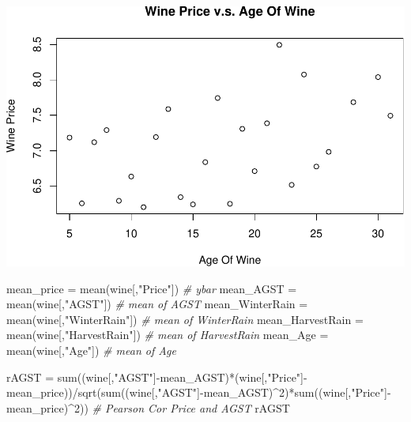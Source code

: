 \documentclass[
]{article}
\newenvironment{Shaded}{\begin{snugshade}}{\end{snugshade}}
\newcommand{\CommentTok}[1]{\textcolor[rgb]{0.56,0.35,0.01}{\textit{#1}}}
\newcommand{\DecValTok}[1]{\textcolor[rgb]{0.00,0.00,0.81}{#1}}
\newcommand{\FunctionTok}[1]{\textcolor[rgb]{0.00,0.00,0.00}{#1}}
\newcommand{\NormalTok}[1]{#1}
\newcommand{\OtherTok}[1]{\textcolor[rgb]{0.56,0.35,0.01}{#1}}
\newcommand{\SpecialCharTok}[1]{\textcolor[rgb]{0.00,0.00,0.00}{#1}}
\newcommand{\StringTok}[1]{\textcolor[rgb]{0.31,0.60,0.02}{#1}}
\begin{document}
\includegraphics{HW2_Wu-Yulun_files/figure-latex/unnamed-chunk-9-4.pdf}

\begin{Shaded}
\begin{Highlighting}[]
\NormalTok{mean\_price }\OtherTok{=} \FunctionTok{mean}\NormalTok{(wine[,}\StringTok{"Price"}\NormalTok{]) }\CommentTok{\# ybar}
\NormalTok{mean\_AGST }\OtherTok{=} \FunctionTok{mean}\NormalTok{(wine[,}\StringTok{"AGST"}\NormalTok{]) }\CommentTok{\# mean of AGST}
\NormalTok{mean\_WinterRain }\OtherTok{=} \FunctionTok{mean}\NormalTok{(wine[,}\StringTok{"WinterRain"}\NormalTok{]) }\CommentTok{\# mean of WinterRain}
\NormalTok{mean\_HarvestRain }\OtherTok{=} \FunctionTok{mean}\NormalTok{(wine[,}\StringTok{"HarvestRain"}\NormalTok{]) }\CommentTok{\# mean of HarvestRain}
\NormalTok{mean\_Age }\OtherTok{=} \FunctionTok{mean}\NormalTok{(wine[,}\StringTok{"Age"}\NormalTok{]) }\CommentTok{\# mean of Age}

\NormalTok{rAGST }\OtherTok{=} \FunctionTok{sum}\NormalTok{((wine[,}\StringTok{"AGST"}\NormalTok{]}\SpecialCharTok{{-}}\NormalTok{mean\_AGST)}\SpecialCharTok{*}\NormalTok{(wine[,}\StringTok{"Price"}\NormalTok{]}\SpecialCharTok{{-}}\NormalTok{mean\_price))}\SpecialCharTok{/}\FunctionTok{sqrt}\NormalTok{(}\FunctionTok{sum}\NormalTok{((wine[,}\StringTok{"AGST"}\NormalTok{]}\SpecialCharTok{{-}}\NormalTok{mean\_AGST)}\SpecialCharTok{\^{}}\DecValTok{2}\NormalTok{)}\SpecialCharTok{*}\FunctionTok{sum}\NormalTok{((wine[,}\StringTok{"Price"}\NormalTok{]}\SpecialCharTok{{-}}\NormalTok{mean\_price)}\SpecialCharTok{\^{}}\DecValTok{2}\NormalTok{)) }\CommentTok{\# Pearson Cor Price and AGST}
\NormalTok{rAGST}
\end{Highlighting}
\end{Shaded}
\end{document}
